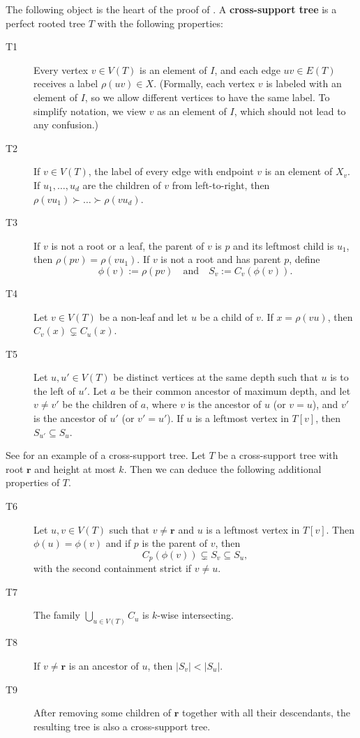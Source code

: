 \documentclass[11pt]{article}
\theoremstyle{definition}
\begin{document}
The following object is the heart of the proof of . A \textbf{cross-support tree} is a perfect rooted tree $T$ with the following properties:
\begin{description}
    \item[T1] Every vertex $v\in V(T)$ is an element of $I$, and each edge $uv\in E(T)$ receives a label $\rho(uv)\in X$. (Formally, each vertex $v$ is labeled with an element of $I$, so we allow different vertices to have the same label. To simplify notation, we view $v$ as an element of $I$, which should not lead to any confusion.)
    \item[T2] If $v\in V(T)$, the label of every edge with endpoint $v$ is an element of $X_v$. If $u_1,\dots,u_d$ are the children of $v$ from left-to-right, then $\rho(vu_1)\succ\dots\succ\rho(vu_d)$.
    \item[T3] If $v$ is not a root or a leaf, the parent of $v$ is $p$ and its leftmost child is $u_1$, then $\rho(pv)=\rho(vu_1)$.  If $v$ is not a root and has parent $p$, define $$\phi(v):=\rho(pv)\quad\text{and}\quad S_v:=C_v(\phi(v)).$$
     \item[T4] Let $v\in V(T)$ be a non-leaf and let $u$ be a child of $v$. If $x=\rho(vu)$, then $C_{v}(x)\subsetneq C_{u}(x)$. 
    \item[T5] Let $u,u'\in V(T)$ be distinct vertices at the same depth such that $u$ is to the left of $u'$. Let $a$ be their common ancestor of maximum depth, and let $v\neq v'$ be the children of $a$, where $v$ is the ancestor of $u$ (or $v=u$), and $v'$ is the ancestor of $u'$ (or $v'=u'$). If $u$ is a leftmost vertex in $T[v]$, then $S_{u'}\subseteq S_u$.
\end{description}
See  for an example of a cross-support tree. Let $T$ be a cross-support tree with root $\mathbf{r}$ and height at most $k$. Then we can deduce the following additional properties of $T$.

\begin{description}
    \item[T6] Let $u,v\in V(T)$ such that $v\neq \mathbf{r}$ and $u$ is a leftmost vertex in $T[v]$. Then $\phi(u)=\phi(v)$ and if $p$ is the parent of $v$, then $$C_p(\phi(v))\subsetneq S_v\subseteq S_u,$$
    with the second containment strict if $v\neq u$.
    \item[T7] The family $\bigcup_{u\in V(T)}C_{u}$ is $k$-wise intersecting.
    \item[T8] If $v\neq \mathbf{r}$ is an ancestor of $u$, then $|S_v|<|S_u|$.
    \item[T9] After removing some children of $\mathbf{r}$ together with all their descendants, the resulting tree is also a cross-support tree.
\end{description}
\end{document}
